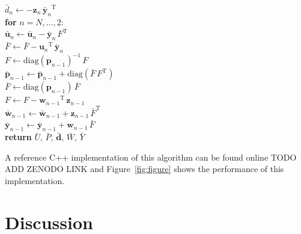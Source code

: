 \documentclass[rnaas]{aastex62}
\newcommand{\figureref}[1]{\ref{fig:#1}}
\newcommand{\Figure}[1]{Figure~\figureref{#1}}
\newcommand{\T}{\ensuremath{\mathrm{T}}}
\newcommand{\bvec}[1]{{\ensuremath{\boldsymbol{#1}}}}
\begin{document}
\begin{minipage}{\linewidth}
\hspace*{2em}\hspace*{2em}$\bar{d}_n \gets -
    \bvec{z}_n\,{\bar{\bvec{y}}_n}^\T$\\
\hspace*{2em}\textbf{for} $n = N,\ldots,2$:\\
\hspace*{2em}\hspace*{2em}$\bar{\bvec{u}}_n \gets \bar{\bvec{u}}_n
    - \bar{\bvec{y}}_n\,F^\T$\\
\hspace*{2em}\hspace*{2em}$\bar{F} \gets \bar{F} - {\bvec{u}_n}^\T \,
    \bar{\bvec{y}}_n$\\
\hspace*{2em}\hspace*{2em}$F \gets \mathrm{diag}(\bvec{p}_{n-1})^{-1}\,F$\\
\hspace*{2em}\hspace*{2em}$\bar{\bvec{p}}_{n-1} \gets \bar{\bvec{p}}_{n-1} +
    \mathrm{diag}(\bar{F}\,F^\T)$\\
\hspace*{2em}\hspace*{2em}$\bar{F} \gets
    \mathrm{diag}(\bvec{p}_{n-1})\,\bar{F}$\\
\hspace*{2em}\hspace*{2em}$F \gets F - {\bvec{w}_{n-1}}^\T\,\bvec{z}_{n-1}$\\
\hspace*{2em}\hspace*{2em}$\bar{\bvec{w}}_{n-1} \gets \bar{\bvec{w}}_{n-1} +
    \bvec{z}_{n-1}\,\bar{F}^\T$\\
\hspace*{2em}\hspace*{2em}$\bar{\bvec{y}}_{n-1} \gets \bar{\bvec{y}}_{n-1} +
    \bvec{w}_{n-1}\,\bar{F}$\\
\hspace*{2em}\textbf{return} $\bar{U}$, $\bar{P}$, $\bar{\bvec{d}}$,
    $\bar{W}$, $\bar{Y}$
\end{minipage}
\medskip

\noindent A reference C++ implementation of this algorithm can be found online
TODO ADD ZENODO LINK and \Figure{figure} shows the performance of this
implementation.

\section{Discussion}
\end{document}
